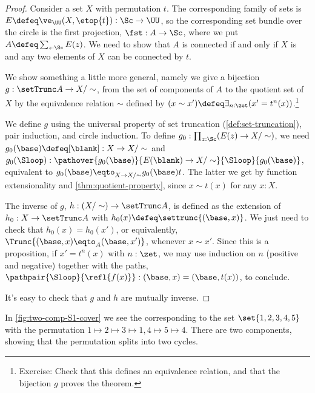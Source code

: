 \begin{proof}
  Consider a set $X$ with permutation $t$.
  The corresponding family of sets is $E\defeq\ve_\UU(X,\etop{t}) : \Sc\to\UU$,
  so the corresponding set bundle over the circle
  is the first projection, $\fst : A \to \Sc$,
  where we put $A\defeq\sum_{z:\Sc}E(z)$.
  We need to show that $A$ is connected if and only if $X$ is \nonempty
  and any two elements of $X$ can be connected by $t$.

  We show something a little more general, namely we give a bijection
  $g : \setTrunc A \to X/\sim$, from the set of components of $A$
  to the quotient set of $X$ by the equivalence relation $\sim$
  defined by $(x\sim x') \defeq \exists_{n:\zet}(x'=t^n(x))$.\footnote{%
    Exercise: Check that this defines an equivalence relation,
    and that the bijection $g$ proves the theorem.}

  We define $g$ using the universal property of set truncation (\cref{def:set-truncation}), pair induction, and circle induction.
  To define $g_0 : \prod_{z:\Sc}(E(z) \to X/\sim)$, we need
  $g_0(\base)\defeq[\blank] : X \to X/\sim$ and
  $g_0(\Sloop) : \pathover{g_0(\base)}{E(\blank) \to X/\sim}{\Sloop}{g_0(\base)}$,
  equivalent to $g_0(\base) \eqto_{X \to X/\sim} g_0(\base)t$.
  The latter we get by function extensionality and \cref{thm:quotient-property},
  since $x \sim t(x)$ for any $x:X$.

  The inverse of $g$, $h:(X/\sim) \to \setTrunc A$,
  is defined as the extension of $h_0 : X \to \setTrunc A$
  with $h_0(x) \defeq \settrunc{(\base,x)}$.
  We just need to check that $h_0(x) = h_0(x')$, or equivalently,
  $\Trunc{(\base,x)\eqto_A(\base,x')}$, whenever $x\sim x'$.
  Since this is a proposition, if $x'=t^n(x)$ with $n:\zet$,
  we may use induction on $n$ (positive and negative)
  together with the paths,
  $\pathpair{\Sloop}{\refl{f(x)}} : (\base,x)=(\base,t(x))$,
  to conclude.

  It's easy to check that $g$ and $h$ are mutually inverse.
\end{proof}
In \cref{fig:two-comp-S1-cover} we see the \covering corresponding
to the set $\set{1,2,3,4,5}$ with the permutation $1\mapsto 2\mapsto 3\mapsto 1,4\mapsto 5\mapsto 4$. There are two components, showing that the permutation splits into two cycles.
